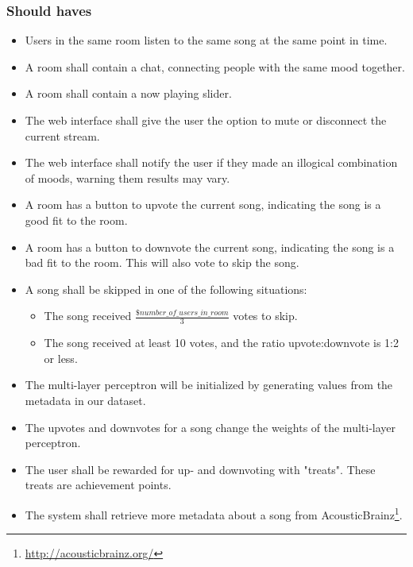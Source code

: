 \subsubsection{Should haves}
\begin{itemize}
\item Users in the same room listen to the same song at the same point in time.

\item A room shall contain a chat, connecting people with the same mood together.

\item A room shall contain a now playing slider.

\item The web interface shall give the user the option to mute or disconnect the current stream.

\item The web interface shall notify the user if they made an illogical combination of moods, warning them results may vary.

\item A room has a button to upvote the current song, indicating the song is a good fit to the room.

\item A room has a button to downvote the current song, indicating the song is a bad fit to the room. This will also vote to skip the song.

\item A song shall be skipped in one of the following situations:
	\begin{itemize}
	\item The song received $\frac{\$number\_of\_users\_in\_room}{3}$ votes to skip.
	\item The song received at least 10 votes, and the ratio upvote:downvote is 1:2 or less.
	\end{itemize}

\item The multi-layer perceptron will be initialized by generating values from the metadata in our dataset.

\item The upvotes and downvotes for a song change the weights of the multi-layer perceptron.

\item The user shall be rewarded for up- and downvoting with "treats". These treats are achievement points.

\item The system shall retrieve more metadata about a song from AcousticBrainz\footnote{\url{http://acousticbrainz.org/}}.

\end{itemize}

